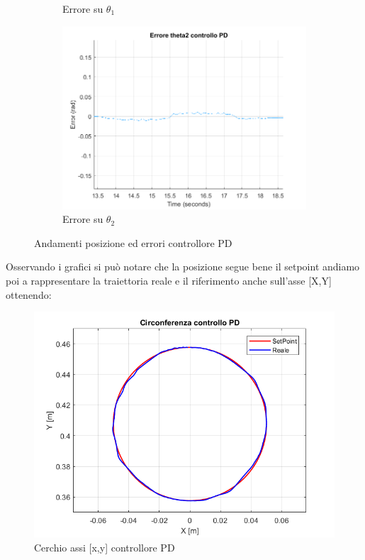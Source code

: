 \begin{figure}[!ht]
\begin{subfigure}{.5\textwidth}
  \caption{Errore su $\theta_1$}
  \label{fig:sub-pd3p}
\end{subfigure}
\begin{subfigure}{.5\textwidth}
  \centering
  \includegraphics[width=.8\linewidth]{Immagini/Traiettorie/ErroreTheta2PD}  
  \caption{Errore su $\theta_2$}
  \label{fig:sub-pd4p}
\end{subfigure}
\caption{Andamenti posizione ed errori controllore PD}
\label{fig:AndamentiPD}
\end{figure}
Osservando i grafici si può notare che la posizione segue bene il setpoint andiamo poi a rappresentare la traiettoria reale e il riferimento anche sull'asse [X,Y] ottenendo: 
\begin{figure}[ht]
	\begin{center}
		\includegraphics[scale=0.5]{Immagini/Traiettorie/Cerchio}
		\caption{Cerchio assi  [x,y] controllore PD}
		\label{fig:PDBracciaC}
	\end{center}
\end{figure}
